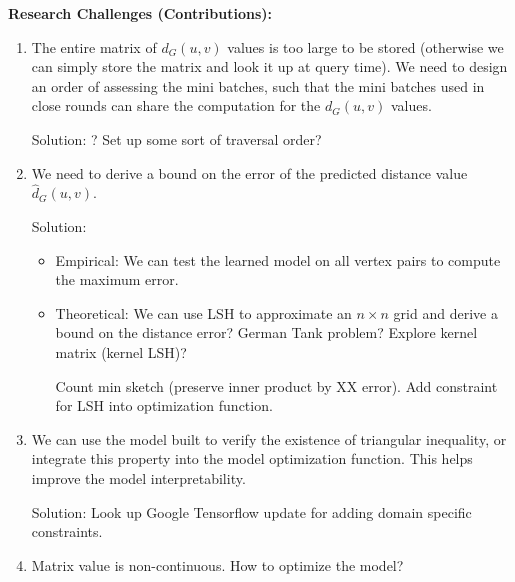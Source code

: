 \documentclass[]{report}   %
\begin{document}
\noindent
\textbf{Research Challenges (Contributions):}

\begin{enumerate}
\item The entire matrix of $d_G(u, v)$ values is too large to be stored (otherwise we can simply store the matrix and look it up at query time). 
We need to design an order of assessing the mini batches, such that the mini batches 
used in close rounds can share the computation for the $d_G(u, v)$ values.

{\color{red}Solution: ?} Set up some sort of traversal order?

\item We need to derive a bound on the error of the predicted distance value $\hat{d}_G(u, v)$.

Solution: 
\begin{itemize}
\item Empirical: We can test the learned model on all vertex pairs to compute the maximum error.

\item {\color{red}Theoretical: We can use LSH to approximate an $n \times n$ grid and derive a bound on the distance error? German Tank problem?} Explore kernel matrix (kernel LSH)?

Count min sketch (preserve inner product by XX error). Add constraint for LSH into optimization function.
\end{itemize}

\item We can use the model built to verify the existence of triangular inequality, or integrate this property into the model optimization function. {\color{red}This helps improve  the 
model interpretability.} 

{\color{red}Solution: Look up Google Tensorflow update for adding domain specific constraints.}

\item Matrix value is non-continuous. How to optimize the model?
\end{enumerate}
\end{document}
